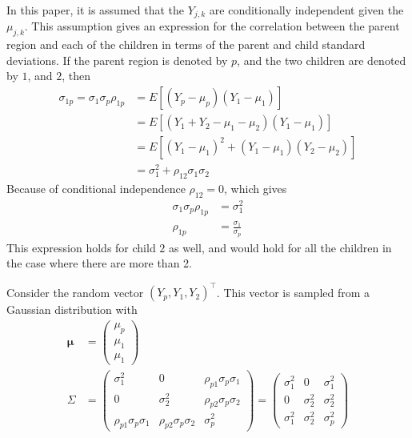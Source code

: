 \documentclass[a4paper,12pt]{article}
\theoremstyle{definition}
\begin{document}
In this paper, it is assumed that the $Y_{j,k}$ are conditionally independent given the $\mu_{j,k}$. This assumption gives an expression for the correlation between the parent region and each of the children in terms of the parent and child standard deviations. If the parent region is denoted by $p$, and the two children are denoted by $1$, and $2$, then
\begin{align*}
	\sigma_{1p} = \sigma_1 \sigma_p \rho_{1p} &= E\left[\left(Y_p - \mu_p \right)\left(Y_1 - \mu_1 \right) \right] \\
		&= E\left[\left( Y_1 + Y_2 - \mu_1 - \mu_2 \right)\left( Y_1 - \mu_1 \right) \right] \\
		&= E\left[\left( Y_1 - \mu_1 \right)^2 + \left( Y_1 - \mu_1 \right)\left( Y_2 - \mu_2 \right) \right] \\
		&= \sigma_1^2 + \rho_{12} \sigma_1 \sigma_2
\end{align*}
Because of conditional independence $\rho_{12} = 0$, which gives
\begin{align*}
	\sigma_1 \sigma_p \rho_{1p} &= \sigma_1^2 \\
	\rho_{1p} &= \frac{\sigma_1}{\sigma_p}
\end{align*}
This expression holds for child $2$ as well, and would hold for all the children in the case where there are more than 2.

Consider the random vector $(Y_p, Y_1, Y_2)^{\top}$. This vector is sampled from a Gaussian distribution with
\begin{align*}
	\boldsymbol{\mu} &= 	\begin{pmatrix}
												\mu_p \\
												\mu_1 \\
												\mu_1
											\end{pmatrix} \\
	\Sigma &=	\begin{pmatrix}
							\sigma_1^2									&	0														& \rho_{p1} \sigma_p \sigma_1 \\
							0 													&	\sigma_2^2									&	\rho_{p2} \sigma_p \sigma_2	\\
							\rho_{p1} \sigma_p \sigma_1 & \rho_{p2} \sigma_p \sigma_2	&	\sigma_p^2
						\end{pmatrix}
					=	\begin{pmatrix}
							\sigma_1^2	&	0						& \sigma_1^2	\\
							0						&	\sigma_2^2	&	\sigma_2^2	\\
							\sigma_1^2	& \sigma_2^2	&	\sigma_p^2
						\end{pmatrix}
\end{align*}
\end{document}
